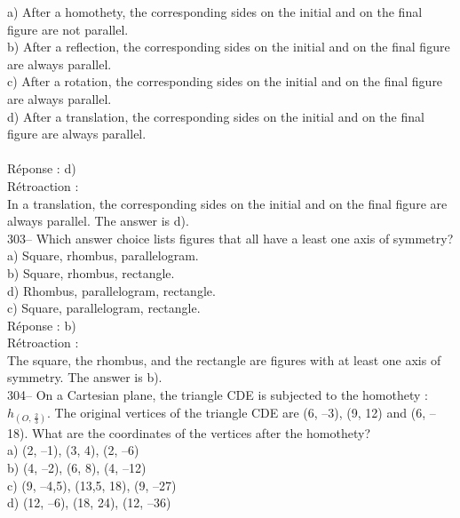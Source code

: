 \documentclass[letterpaper, 12pt]{article}
\begin{document}
a) After a homothety, the corresponding sides on the initial and on the final figure are not parallel.\\
b) After a reflection, the corresponding sides on the initial and on the final figure are always parallel.\\
c) After a rotation, the corresponding sides on the initial and on the final figure are always parallel.\\
d) After a translation, the corresponding sides on the initial and on the final figure are always parallel.\\\\

R\'eponse : d)\\

R\'etroaction : \\
In a translation,  the corresponding sides on the initial and on the final figure are always parallel. The answer is d).\\

303-- Which answer choice lists figures that all have a least one axis of symmetry?\\

a) Square, rhombus, parallelogram.\\
b) Square, rhombus, rectangle.\\
d) Rhombus, parallelogram, rectangle.\\
c) Square, parallelogram, rectangle.\\

R\'eponse : b)\\

R\'etroaction :\\
The square, the rhombus, and the rectangle are figures with at least one axis of symmetry. The answer is b).\\



304-- On a Cartesian plane, the triangle CDE is subjected to the
homothety : $h_{\left( O,\,\frac{2}{3}\right)}$.  The original
vertices of the triangle CDE are (6,
--3), (9, 12) and (6, --18).  What are the coordinates of the vertices after the homothety?\\

a) (2, --1), (3, 4), (2, --6)\\
b) (4, --2), (6, 8), (4, --12)\\
c) (9, --4,5), (13,5, 18), (9, --27)\\
d) (12, --6), (18, 24), (12, --36)\\
\end{document}
